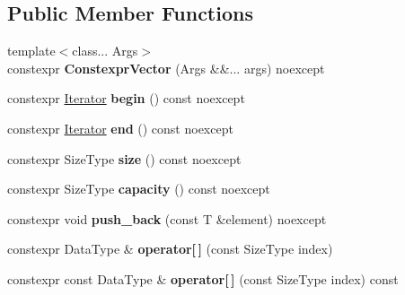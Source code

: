 \subsection*{Public Member Functions}
\begin{DoxyCompactItemize}
\item 
\mbox{\label{classbzd_1_1impl_1_1format_1_1ConstexprVector_a00b7cb3759c6ba0ae030247613883ca7}} 
{\footnotesize template$<$class... Args$>$ }\\constexpr {\bfseries Constexpr\+Vector} (Args \&\&... args) noexcept
\item 
\mbox{\label{classbzd_1_1impl_1_1format_1_1ConstexprVector_ac506e48d09557fcba03920b34ac3a897}} 
constexpr \hyperlink{classbzd_1_1impl_1_1format_1_1ConstexprVector_1_1Iterator}{Iterator} {\bfseries begin} () const noexcept
\item 
\mbox{\label{classbzd_1_1impl_1_1format_1_1ConstexprVector_af0d275e5ccfb3578a95c344c90da123e}} 
constexpr \hyperlink{classbzd_1_1impl_1_1format_1_1ConstexprVector_1_1Iterator}{Iterator} {\bfseries end} () const noexcept
\item 
\mbox{\label{classbzd_1_1impl_1_1format_1_1ConstexprVector_a0eb00928c9be6aa5ea71d557e4788a70}} 
constexpr Size\+Type {\bfseries size} () const noexcept
\item 
\mbox{\label{classbzd_1_1impl_1_1format_1_1ConstexprVector_a40d78c34df7a06ca80d75b85b8273784}} 
constexpr Size\+Type {\bfseries capacity} () const noexcept
\item 
\mbox{\label{classbzd_1_1impl_1_1format_1_1ConstexprVector_af9974183d2f72974b7c249099acf3bbf}} 
constexpr void {\bfseries push\+\_\+back} (const T \&element) noexcept
\item 
\mbox{\label{classbzd_1_1impl_1_1format_1_1ConstexprVector_ae2fe3f525dabc361403d8289c16516e2}} 
constexpr Data\+Type \& {\bfseries operator\mbox{[}$\,$\mbox{]}} (const Size\+Type index)
\item 
\mbox{\label{classbzd_1_1impl_1_1format_1_1ConstexprVector_a60dc8c51ac6e2110a3dfbad663f7e823}} 
constexpr const Data\+Type \& {\bfseries operator\mbox{[}$\,$\mbox{]}} (const Size\+Type index) const
\end{DoxyCompactItemize}


